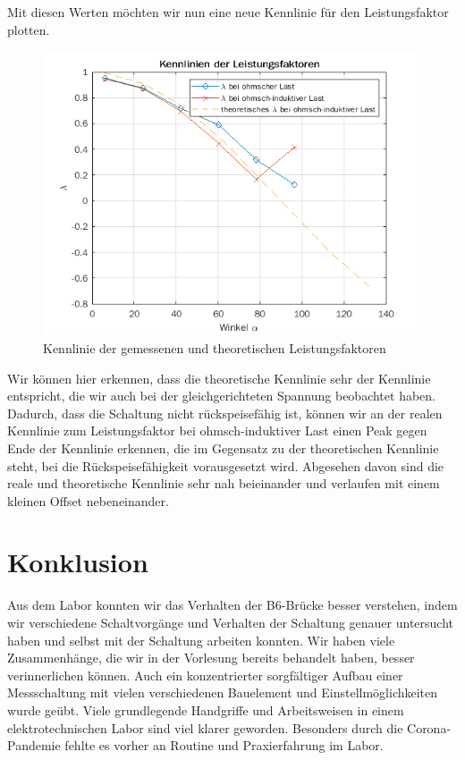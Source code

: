\documentclass{article}
\begin{document}
\pagebreak[4]

Mit diesen Werten möchten wir nun eine neue Kennlinie für den Leistungsfaktor plotten.

\begin{figure}[!h]
  \centering
  \includegraphics[width=.75\textwidth]{../assets/images/GEP2/lambda_alpha.png}
  \caption{Kennlinie der gemessenen und theoretischen Leistungsfaktoren}
  \label{fig:lambda}
\end{figure}


Wir können hier erkennen, dass die theoretische Kennlinie sehr der Kennlinie entspricht, die wir auch bei der gleichgerichteten Spannung beobachtet haben. Dadurch, dass die Schaltung nicht rückspeisefähig ist, können wir an der realen Kennlinie zum Leistungsfaktor bei ohmsch-induktiver Last einen Peak gegen Ende der Kennlinie erkennen, die im Gegensatz zu der theoretischen Kennlinie steht, bei die Rückspeisefähigkeit vorausgesetzt wird. Abgesehen davon sind die reale und theoretische Kennlinie sehr nah beieinander und verlaufen mit einem kleinen Offset nebeneinander.


\section{Konklusion}
\label{sec:konklusion}

Aus dem Labor konnten wir das Verhalten der B6-Brücke besser verstehen, indem wir verschiedene Schaltvorgänge und Verhalten der Schaltung genauer untersucht haben und selbst mit der Schaltung arbeiten konnten. Wir haben viele Zusammenhänge, die wir in der Vorlesung bereits behandelt haben, besser verinnerlichen können. Auch ein konzentrierter sorgfältiger Aufbau einer Messschaltung mit vielen verschiedenen Bauelement und Einstellmöglichkeiten wurde geübt. Viele grundlegende Handgriffe und Arbeitsweisen in einem elektrotechnischen Labor sind viel klarer geworden. Besonders durch die Corona-Pandemie fehlte es vorher an Routine und Praxierfahrung im Labor.
\end{document}
